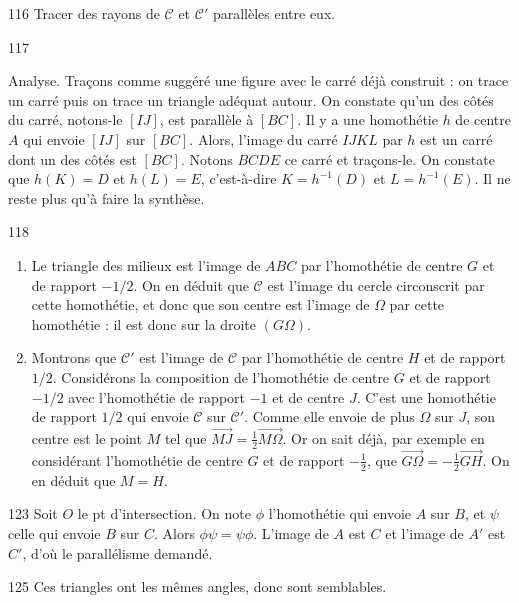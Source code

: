 \begin{Soln}{116}
Tracer des rayons de $\mathcal C$ et $\mathcal C'$ parallèles entre eux.
\end{Soln}
\begin{Soln}{117}

Analyse. Traçons comme suggéré une figure avec le carré déjà construit : on trace un carré puis on trace un triangle adéquat autour. On constate qu'un des côtés du carré, notons-le $[IJ]$, est parallèle à $[BC]$. Il y a une homothétie $h$ de centre $A$ qui envoie $[IJ]$ sur $[BC]$. Alors, l'image du carré $IJKL$ par $h$ est un carré dont un des côtés est $[BC]$. Notons $BCDE$ ce carré et traçons-le. On constate que $h(K)=D$ et $h(L)=E$, c'est-à-dire $K=h^{-1}(D)$ et $L = h^{-1}(E)$. Il ne reste plus qu'à faire la synthèse.


\end{Soln}
\begin{Soln}{118}
\begin{enumerate}
\item Le triangle des milieux est l'image de $ABC$ par l'homothétie de centre $G$ et de rapport $-1/2$. On en déduit que $\mathcal C$ est l'image du cercle circonscrit par cette homothétie, et donc que son centre est l'image de $\Omega$ par cette homothétie : il est donc sur la droite $(G\Omega)$.

\item Montrons que $\mathcal C'$ est l'image de $\mathcal C$ par l'homothétie de centre $H$ et de rapport $1/2$. Considérons la composition de l'homothétie de centre $G$ et de rapport $-1/2$ avec l'homothétie de rapport $-1$ et de centre $J$. C'est une homothétie de rapport $1/2$ qui envoie $\mathcal C$ sur $\mathcal C'$. Comme elle envoie de plus $\Omega$ sur $J$, son centre est le point $M$ tel que $\overrightarrow{MJ}=\frac12\overrightarrow{M\Omega}$. Or on sait déjà, par exemple en considérant l'homothétie de centre $G$ et de rapport $-\frac12$, que $\overrightarrow{G\Omega}=-\frac12\overrightarrow{GH}$. On en déduit que $M=H$.
\end{enumerate}
\end{Soln}
\begin{Soln}{123}
Soit $O$ le pt d'intersection. On note $\phi$ l'homothétie qui envoie $A$ sur $B$, et $\psi$ celle qui envoie $B$ sur $C$. Alors $\phi\psi = \psi\phi$. L'image de $A$ est $C$ et l'image de $A'$ est $C'$, d'où le  parallélisme demandé.
\end{Soln}
\begin{Soln}{125}
Ces triangles ont les mêmes angles, donc sont semblables.
\end{Soln}
